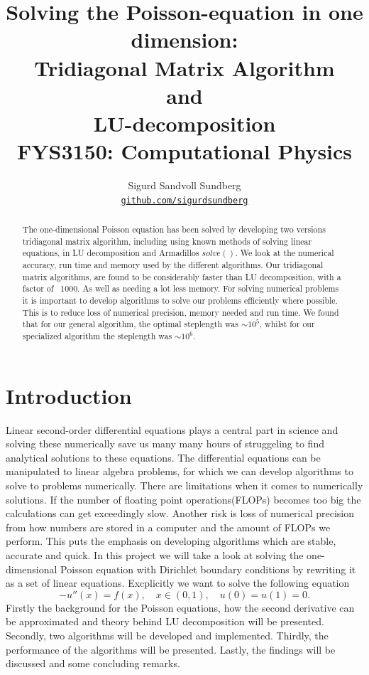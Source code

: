 \documentclass[10pt, a4paper]{amsart}
\title[Solving the Poisson-equation in one dimension]{Solving the Poisson-equation in one dimension: \\
\normalsize{Tridiagonal Matrix Algorithm\\
 and \\
 LU-decomposition} \\
  \hrulefill\small{ FYS3150: Computational Physics }\hrulefill}
\author[Sundberg]{Sigurd Sandvoll Sundberg \\
  \href{https://github.com/SigurdSundberg/FYS3150/tree/master/project1}{\texttt{github.com/sigurdsundberg}}}
\begin{document}
\begin{titlepage}
\begin{abstract}
The one-dimensional Poisson equation has been solved by developing two versions tridiagonal matrix algorithm, including using known methods of solving linear equations, in LU decomposition and Armadillos $solve()$. We look at the numerical accuracy, run time and memory used by the different algorithms. Our tridiagonal matrix algorithms, are found to be considerably faster than LU decomposition, with a factor of ~1000. As well as needing a lot less memory. For solving numerical problems it is important to develop algorithms to solve our problems efficiently where possible. This is to reduce loss of numerical precision, memory needed and run time. We found that for our general algorithm, the optimal steplength was $\sim10^{5}$, whilst for our specialized algorithm the steplength was $\sim10^{6}$. 
\end{abstract}
\maketitle
\tableofcontents
\end{titlepage}

\section{Introduction}
Linear second-order differential equations plays a central part in science and solving these numerically save us many many hours of struggeling to find analytical solutions to these equations. The differential equations can be manipulated to linear algebra problems, for which we can develop algorithms to solve to problems numerically. There are limitations when it comes to numerically solutions. If the number of floating point operations(FLOPs) becomes too big the calculations can get exceedingly slow. Another risk is loss of numerical precision from how numbers are stored in a computer and the amount of FLOPs we perform. This puts the emphasis on developing algorithms which are stable, accurate and quick. 
In this project we will take a look at solving the one-dimensional Poisson equation with Dirichlet boundary conditions by rewriting it as a set of linear equations. Excplicitly we want to solve the following equation
\begin{equation}
-u''(x) = f(x), \quad x\in(0,1), \quad u(0)=u(1)=0.\label{eq:base}
\end{equation}
Firstly the background for the Poisson equations, how the second derivative can be approximated and theory behind LU decomposition will be presented. Secondly, two algorithms will be developed and implemented. Thirdly, the performance of the algorithms will be presented. Lastly, the findings will be discussed and some concluding remarks. 
\end{document}
